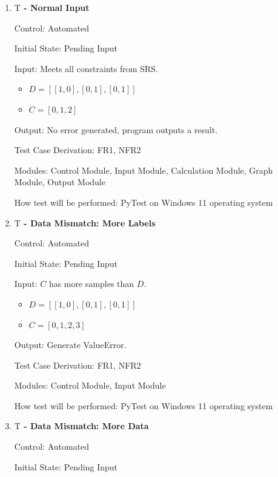 \documentclass[12pt, titlepage]{article}
\newcounter{testnum} %
\begin{document}
\begin{enumerate}
\item{T\thetestnum \textbf{\label{T:norm} 
 - Normal Input}}

Control: Automated
					
Initial State: Pending Input
					
Input: Meets all constraints from SRS.
\begin{itemize}
    \item $D = [[1, 0], [0, 1], [0, 1]]$
    \item $C = [0, 1, 2]$
\end{itemize}	

Output: No error generated, program outputs a result.

Test Case Derivation: FR1, NFR2

Modules: Control Module, Input Module, Calculation Module, Graph Module, Output Module
					
How test will be performed: PyTest on Windows 11 operating system

\item{T\thetestnum \textbf{\label{T:moreLabels} 
 - Data Mismatch: More Labels}}

Control: Automated
					
Initial State: Pending Input
					
Input: $C$ has more samples than $D$.
\begin{itemize}
    \item $D = [[1, 0], [0, 1], [0, 1]]$
    \item $C = [0, 1, 2, 3]$
\end{itemize}
					
Output: Generate ValueError.

Test Case Derivation: FR1, NFR2

Modules: Control Module, Input Module

How test will be performed: PyTest on Windows 11 operating system

\item{T\thetestnum \textbf{\label{T:}  
 - Data Mismatch: More Data}}

Control: Automated
					
Initial State: Pending Input
					

\end{enumerate}
\end{document}
